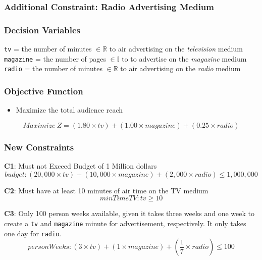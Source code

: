 \documentclass[
  12pt,
]{article}
\providecommand{\tightlist}{%
  \setlength{\itemsep}{0pt}\setlength{\parskip}{0pt}}
\begin{document}
\hypertarget{additional-constraint-radio-advertising-medium}{%
\subsubsection{Additional Constraint: Radio Advertising
Medium}\label{additional-constraint-radio-advertising-medium}}

\hypertarget{decision-variables-2}{%
\subsubsection{Decision Variables}\label{decision-variables-2}}

\texttt{tv} = the number of minutes \(\in \mathbb{R}\) to air
advertising on the \emph{television} medium\\
\texttt{magazine} = the number of pages \(\in \mathbb{I}\) to to
advertise on the \emph{magazine} medium \texttt{radio} = the number of
minutes \(\in \mathbb{R}\) to air advertising on the \emph{radio} medium

\hypertarget{objective-function-2}{%
\subsubsection{Objective Function}\label{objective-function-2}}

\begin{itemize}
\tightlist
\item
  Maximize the total audience reach
\end{itemize}

\[
Maximize \ Z = (1.80\times tv) + (1.00 \times magazine) + (0.25 \times radio)
\]

\hypertarget{new-constraints}{%
\subsubsection{New Constraints}\label{new-constraints}}

\textbf{C1}: Must not Exceed Budget of 1 Million dollars \[
budget: (20,000 \times tv) + (10,000 \times magazine) + (2,000 \times radio) \leq 1,000,000
\]

\textbf{C2}: Must have at least 10 minutes of air time on the TV
medium\\
\[
minTimeTV: tv \geq 10
\]

\textbf{C3}: Only 100 person weeks available, given it takes three weeks
and one week to create a \texttt{tv} and \texttt{magazine} minute for
advertisement, respectively. It only takes one day for \texttt{radio}.\\
\[
personWeeks: (3 \times tv) + (1 \times magazine) + (\frac{1}{7} \times radio) \leq 100
\]
\end{document}
